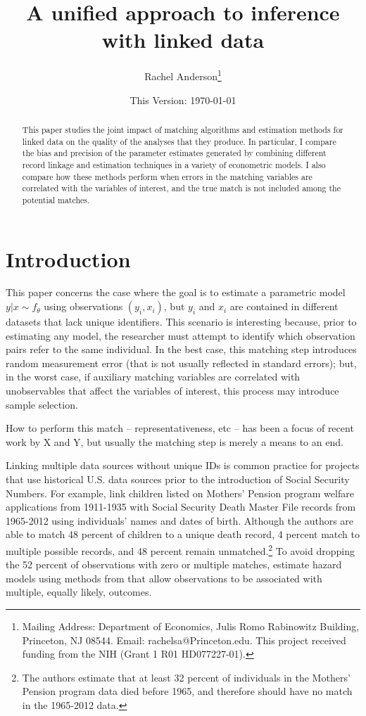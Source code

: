 \documentclass[12pt]{article}
\title{\singlespacing A unified approach to inference with linked data}
\author{Rachel Anderson\thanks{Mailing Address: Department of Economics, Julis Romo Rabinowitz Building,
Princeton, NJ 08544. Email: rachelsa@Princeton.edu.
This project received funding from the NIH (Grant 1 R01 HD077227-01). }}
\date{This Version: \today}
\begin{document}
\maketitle


\begin{abstract}
\singlespacing
\noindent This paper studies the joint impact of matching algorithms and estimation methods for linked data on the quality of the analyses that they produce.  In particular, I compare the bias and precision of the parameter estimates generated by combining different record linkage and estimation techniques in a variety of econometric models.  I also compare how these methods perform when errors in the matching variables are correlated with the variables of interest, and the true match is not included among the potential matches.  \end{abstract}


\section{Introduction}

This paper concerns the case where the goal is to estimate a parametric model $y|x \sim f_{\theta}$ using observations $(y_i, x_i)$, but $y_i$ and $x_i$ are contained in different datasets that lack unique identifiers.  This scenario is interesting because, prior to estimating any model, the researcher must attempt to identify which observation pairs refer to the same individual.  In the best case, this matching step introduces random measurement error (that is not usually reflected in standard errors); but, in the worst case, if auxiliary matching variables are correlated with unobservables that affect the variables of interest, this process may introduce sample selection.   

How to perform this match -- representativeness, etc -- has been a focus of recent work by X and Y, but usually the matching step is merely a means to an end.  

Linking multiple data sources without unique IDs is common practice for projects that use historical U.S. data sources prior to the introduction of Social Security Numbers.  For example, \cite{aizer2016} link children listed on Mothers' Pension program welfare applications from 1911-1935 with Social Security Death Master File records from 1965-2012 using individuals' names and dates of birth.  Although the authors are able to match 48 percent of children to a unique death record, 4 percent match to multiple possible records, and 48 percent remain unmatched.\footnote{The authors estimate that at least 32 percent of individuals in the Mothers' Pension program data died before 1965, and therefore should have no match in the 1965-2012 data.}  To avoid dropping the 52 percent of observations with zero or multiple matches, \cite{aizer2016} estimate hazard models using methods from \cite{ahl2019} that allow observations to be associated with multiple, equally likely, outcomes.  
\end{document}
